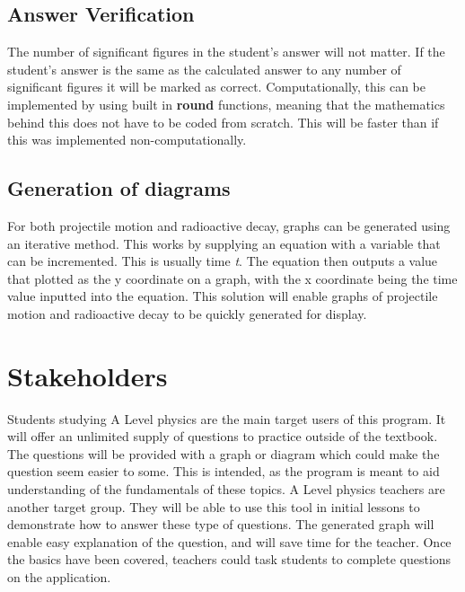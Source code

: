 \subsection{Answer Verification}
The number of significant figures in the student's answer will not matter. If the student's answer is the same as the calculated answer to any number of significant figures it will be marked as correct. Computationally, this can be implemented by using built in \textbf{round} functions, meaning that the mathematics behind this does not have to be coded from scratch. This will be faster than if this was implemented non-computationally.
\subsection{Generation of diagrams}
For both projectile motion and radioactive decay, graphs can be generated using an iterative method. This works by supplying an equation with a variable that can be incremented. This is usually time \textit{t}. The equation then outputs a value that plotted as the y coordinate on a graph, with the x coordinate being the time value inputted into the equation. This solution will enable graphs of projectile motion and radioactive decay to be quickly generated for display.
\section{Stakeholders}
Students studying A Level physics are the main target users of this program. It will offer an unlimited supply of questions to practice outside of the textbook. The questions will be provided with a graph or diagram which could make the question seem easier to some. This is intended, as the program is meant to aid understanding of the fundamentals of these topics. 
A Level physics teachers are another target group. They will be able to use this tool in initial lessons to demonstrate how to answer these type of questions. The generated graph will enable easy explanation of the question, and will save time for the teacher. Once the basics have been covered, teachers could task students to complete questions on the application.
\clearpage
